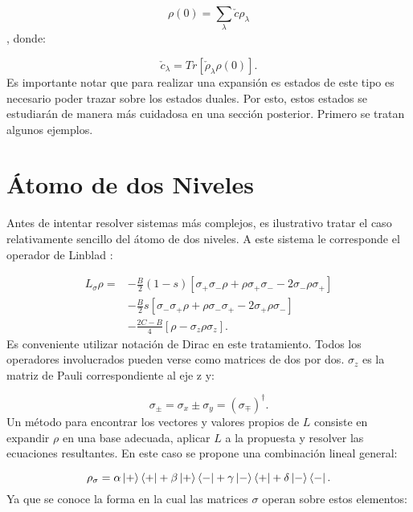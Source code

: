 \documentclass[a4paper,10pt]{report}
\begin{document}
\begin{equation}
\rho(0) = \sum_{\lambda} \check{c} \rho_{\lambda}
\end{equation}, donde:

\begin{equation}
\check{c}_\lambda = Tr[\check{\rho}_\lambda \rho(0)].
\end{equation} Es importante notar que para realizar una expansión es estados de este tipo es necesario poder trazar sobre los estados duales. Por esto, estos estados se estudiarán de manera más cuidadosa en una sección posterior. Primero se tratan algunos ejemplos.

\section{Átomo de dos Niveles}

Antes de intentar resolver sistemas más complejos, es ilustrativo tratar el caso relativamente sencillo del átomo de dos niveles. A este sistema le corresponde el operador de Linblad \cite{EnglertDB}:

\begin{align}\label{TwoLevel}
 L_{\sigma}\rho = 
 &-\frac{B}{2}(1-s)[\sigma_+\sigma_-\rho + \rho\sigma_+\sigma_--2\sigma_-\rho\sigma_+ ]\nonumber\\
 &-\frac{B}{2}s[\sigma_-\sigma_+\rho + \rho\sigma_-\sigma_+-2\sigma_+\rho\sigma_- ]\nonumber\\
 &-\frac{2C-B}{4}[\rho - \sigma_z\rho\sigma_z].
\end{align} Es conveniente utilizar notación de Dirac en este tratamiento. Todos los operadores involucrados pueden verse como matrices de dos por dos. $\sigma_z$ es la matriz de Pauli correspondiente al eje z y:

\begin{equation}
\sigma_{\pm} = \sigma_x \pm \sigma_y = (\sigma_{\mp}) ^\dagger.
\end{equation} Un método \cite{BarnettSD} para encontrar los vectores y valores propios de $L$ consiste en expandir $\rho$ en una base adecuada, aplicar $L$ a la propuesta y resolver las ecuaciones resultantes. En este caso se propone una combinación lineal general:

\begin{equation}
\rho_\sigma = \alpha\Ket{+}\Bra{+}+\beta\Ket{+}\Bra{-}+\gamma\Ket{-}\Bra{+}+\delta\Ket{-}\Bra{-}.
\end{equation} Ya que se conoce la forma en la cual las matrices $\sigma$ operan sobre estos elementos:
\end{document}
